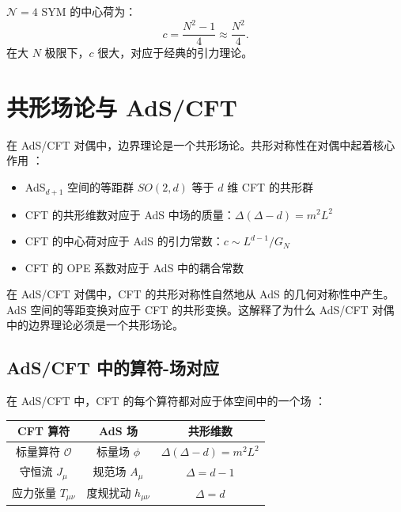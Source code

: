 \begin{property}[$\mathcal{N}=4$ SYM 的中心荷]
$\mathcal{N}=4$ SYM 的中心荷为：
\begin{equation}
    c = \frac{N^2 - 1}{4} \approx \frac{N^2}{4}.
\end{equation}
在大 $N$ 极限下，$c$ 很大，对应于经典的引力理论。
\end{property}

\section{共形场论与 AdS/CFT}

在 AdS/CFT 对偶中，边界理论是一个共形场论。共形对称性在对偶中起着核心作用 \cite{Maldacena1997}：
\begin{itemize}
    \item AdS$_{d+1}$ 空间的等距群 $SO(2,d)$ 等于 $d$ 维 CFT 的共形群
    \item CFT 的共形维数对应于 AdS 中场的质量：$\Delta(\Delta-d) = m^2 L^2$ \cite{Gubser1998}
    \item CFT 的中心荷对应于 AdS 的引力常数：$c \sim L^{d-1}/G_N$
    \item CFT 的 OPE 系数对应于 AdS 中的耦合常数
\end{itemize}

\begin{note}[对称性起源]
在 AdS/CFT 对偶中，CFT 的共形对称性自然地从 AdS 的几何对称性中产生。AdS 空间的等距变换对应于 CFT 的共形变换。这解释了为什么 AdS/CFT 对偶中的边界理论必须是一个共形场论。
\end{note}

\subsection{AdS/CFT 中的算符-场对应}

\begin{theorem}[算符-场对应]
在 AdS/CFT 中，CFT 的每个算符都对应于体空间中的一个场 \cite{Gubser1998, Witten1998}：
\begin{center}
\begin{tabular}{|c|c|c|}
\hline
\textbf{CFT 算符} & \textbf{AdS 场} & \textbf{共形维数} \\
\hline
标量算符 $\mathcal{O}$ & 标量场 $\phi$ & $\Delta(\Delta-d) = m^2 L^2$ \\
守恒流 $J_\mu$ & 规范场 $A_\mu$ & $\Delta = d-1$ \\
应力张量 $T_{\mu\nu}$ & 度规扰动 $h_{\mu\nu}$ & $\Delta = d$ \\
\hline
\end{tabular}
\end{center}
\end{theorem}

